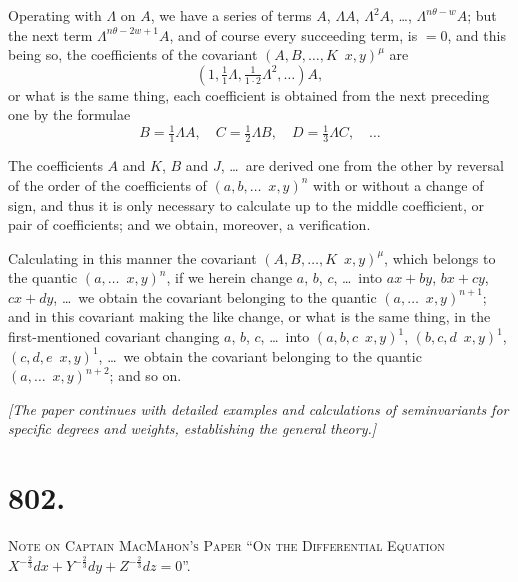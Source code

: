 \documentclass[11pt,a4paper]{book}
\begin{document}
Operating with $\Lambda$ on $A$, we have a series of terms $A$, $\Lambda A$, $\Lambda^2 A$, \ldots, $\Lambda^{n\theta - w} A$; but the next term $\Lambda^{n\theta - 2w + 1} A$, and of course every succeeding term, is $=0$, and this being so, the coefficients of the covariant $(A, B, \ldots, K \!\!\!\! \,\,\, x, y)^\mu$ are
\[
(1, \tfrac{1}{1}\Lambda, \tfrac{1}{1 \cdot 2}\Lambda^2, \ldots) A,
\]
or what is the same thing, each coefficient is obtained from the next preceding one by the formulae
\[
B = \tfrac{1}{1}\Lambda A, \quad C = \tfrac{1}{2}\Lambda B, \quad D = \tfrac{1}{3}\Lambda C, \quad \ldots
\]

The coefficients $A$ and $K$, $B$ and $J$, \ldots\ are derived one from the other by reversal of the order of the coefficients of $(a, b, \ldots \!\!\!\! \,\,\, x, y)^n$ with or without a change of sign, and thus it is only necessary to calculate up to the middle coefficient, or pair of coefficients; and we obtain, moreover, a verification.

Calculating in this manner the covariant $(A, B, \ldots, K \!\!\!\! \,\,\, x, y)^\mu$, which belongs to the quantic $(a, \ldots \!\!\!\! \,\,\, x, y)^n$, if we herein change $a$, $b$, $c$, \ldots\ into $ax + by$, $bx + cy$, $cx + dy$, \ldots\ we obtain the covariant belonging to the quantic $(a, \ldots \!\!\!\! \,\,\, x, y)^{n+1}$; and in this covariant making the like change, or what is the same thing, in the first-mentioned covariant changing $a$, $b$, $c$, \ldots\ into $(a, b, c \!\!\!\! \,\,\, x, y)^1$, $(b, c, d \!\!\!\! \,\,\, x, y)^1$, $(c, d, e \!\!\!\! \,\,\, x, y)^1$, \ldots\ we obtain the covariant belonging to the quantic $(a, \ldots \!\!\!\! \,\,\, x, y)^{n+2}$; and so on.

\vspace{0.5cm}
\noindent\textit{[The paper continues with detailed examples and calculations of seminvariants for specific degrees and weights, establishing the general theory.]}
\vspace{0.5cm}



\newpage
\section*{802.}
\begin{center}
{\large\scshape Note on Captain MacMahon's Paper ``On the Differential Equation}\\
{\large\scshape $X^{-\frac{2}{3}}dx + Y^{-\frac{2}{3}}dy + Z^{-\frac{2}{3}}dz = 0$''.}
\end{center}
\end{document}
